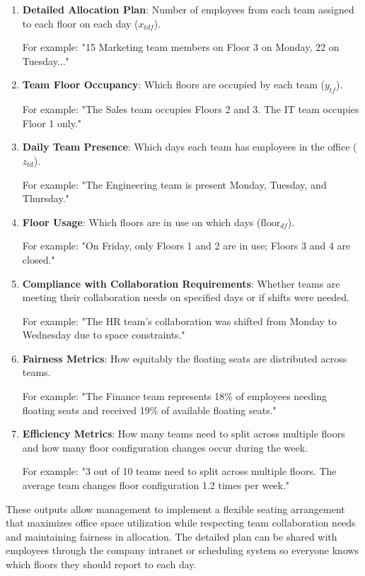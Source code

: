 \documentclass[12pt,a4paper]{article}
\begin{document}
\begin{enumerate}
\item \textbf{Detailed Allocation Plan}: Number of employees from each team assigned to each floor on each day ($x_{tdf}$).

   For example: "15 Marketing team members on Floor 3 on Monday, 22 on Tuesday..."

\item \textbf{Team Floor Occupancy}: Which floors are occupied by each team ($y_{tf}$).

   For example: "The Sales team occupies Floors 2 and 3. The IT team occupies Floor 1 only."

\item \textbf{Daily Team Presence}: Which days each team has employees in the office ($z_{td}$).

   For example: "The Engineering team is present Monday, Tuesday, and Thursday."

\item \textbf{Floor Usage}: Which floors are in use on which days ($\text{floor}_{df}$).

   For example: "On Friday, only Floors 1 and 2 are in use; Floors 3 and 4 are closed."

\item \textbf{Compliance with Collaboration Requirements}: Whether teams are meeting their collaboration needs on specified days or if shifts were needed.

   For example: "The HR team's collaboration was shifted from Monday to Wednesday due to space constraints."

\item \textbf{Fairness Metrics}: How equitably the floating seats are distributed across teams.

   For example: "The Finance team represents 18\% of employees needing floating seats and received 19\% of available floating seats."

\item \textbf{Efficiency Metrics}: How many teams need to split across multiple floors and how many floor configuration changes occur during the week.

   For example: "3 out of 10 teams need to split across multiple floors. The average team changes floor configuration 1.2 times per week."
\end{enumerate}

These outputs allow management to implement a flexible seating arrangement that maximizes office space utilization while respecting team collaboration needs and maintaining fairness in allocation. The detailed plan can be shared with employees through the company intranet or scheduling system so everyone knows which floors they should report to each day.
\end{document}
